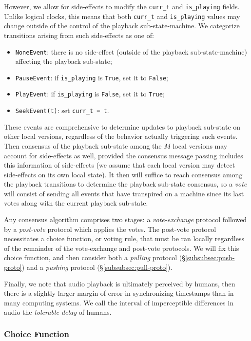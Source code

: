 \documentclass[%
               nonacm,sigconf,10pt]{acmart}
\newcommand{\py}[1]{\texttt{#1}}
\begin{document}
However, we allow for side-effects to modify the \py{curr_t} and \py{is_playing} fields. Unlike logical clocks, this means that both \py{curr_t} and \py{is_playing} values may change outside of the control of the playback sub-state-machine. We categorize transitions arising from such side-effects as one of:

\begin{itemize}
    \item \py{NoneEvent}: there is no side-effect (outside of the playback sub-state-machine) affecting the playback sub-state;
    \item \py{PauseEvent}: if \py{is_playing} is \py{True}, set it to \py{False};
    \item \py{PlayEvent}: if \py{is_playing} is \py{False}, set it to \py{True};
    \item \py{SeekEvent(t)}: set \py{curr_t = t}.
\end{itemize}

These events are comprehensive to determine updates to playback sub-state on other local versions, regardless of the behavior actually triggering such events. Then consensus of the playback sub-state among the $M$ local versions may account for side-effects as well, provided the consensus message passing includes this information of side-effects (we assume that each local version may detect side-effects on its own local state). It then will suffice to reach consensus among the playback transitions to determine the playback sub-state consensus, so a {\it vote} will consist of sending all events that have transpired on a machine since its last votes along with the current playback sub-state.

Any consensus algorithm comprises two stages: a {\it vote-exchange} protocol followed by a {\it post-vote} protocol which applies the votes. The post-vote protocol necessitates a choice function, or voting rule, that must be ran locally regardless of the remainder of the vote-exchange and post-vote protocols. We will fix this choice function, and then consider both a {\it pulling} protocol (\S \ref{subsubsec:push-proto}) and a {\it pushing} protocol (\S \ref{subsubsec:pull-proto}).

Finally, we note that audio playback is ultimately perceived by humans, then there is a slightly larger margin of error in synchronizing timestamps than in many computing systems. We call the interval of imperceptible differences in audio the {\it tolerable delay} of humans.

\subsubsection{Choice Function}\label{subsubsec:choice}
\end{document}
